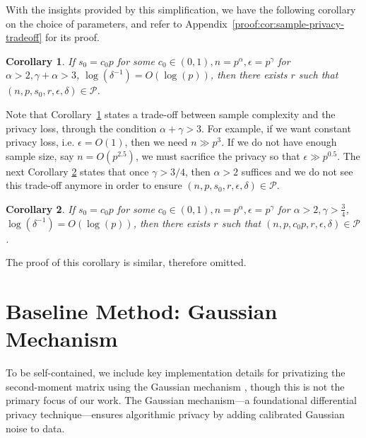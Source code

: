 \documentclass[11pt]{article}
\newtheorem{corollary}{Corollary}%
\begin{document}
With the insights provided by this simplification, we have the following corollary on the choice of parameters, and refer to Appendix~\ref{proof:cor:sample-privacy-tradeoff} for its proof. 
\begin{corollary}\label{cor:sample-privacy-tradeoff}
    If $s_0 = c_0p$ for some $c_0 \in (0,1), n=p^{\alpha},\epsilon=p^\gamma$ for $\alpha>2,\gamma+\alpha>3$, $\log(\delta^{-1})=O(\log(p))$, then there exists $r$ such that $(n,p,s_0,r,\epsilon,\delta)\in\mathcal{P}$. 
    
\end{corollary}

Note that Corollary~\ref{cor:sample-privacy-tradeoff} states a trade-off between sample complexity and the privacy loss, through the condition $\alpha+\gamma>3$. For example, if we want constant privacy loss, i.e. $\epsilon=O(1)$, then we need $n\gg p^3$. If we do not have enough sample size, say $n=O(p^{2.5})$, we must sacrifice the privacy so that $\epsilon\gg p^{0.5}$. The next Corollary \ref{cor:privacy-upper-bound} states that once $\gamma> 3/4$, then $\alpha>2$ suffices and we do not see this trade-off anymore in order to ensure $(n,p,s_0,r,\epsilon,\delta)\in\mathcal{P}$.

\begin{corollary}\label{cor:privacy-upper-bound}
    If $s_0 = c_0p$ for some $c_0 \in (0,1), n=p^{\alpha},\epsilon=p^\gamma$ for $\alpha>2,\gamma>\frac{3}{4}$, $\log(\delta^{-1})=O(\log(p))$, then there exists $r$ such that $(n,p,c_0p,r,\epsilon,\delta)\in\mathcal{P}$. 
\end{corollary}
The proof of this corollary is similar, therefore omitted.

\section{Baseline Method: Gaussian Mechanism}\label{sec:baseline}
To be self-contained,  we include key implementation details for privatizing the second-moment matrix using the Gaussian mechanism \citep{analyzegauss}, though this is not the primary focus of our work. The Gaussian mechanism---a foundational differential privacy technique---ensures algorithmic privacy by adding calibrated Gaussian noise to data.
\end{document}
